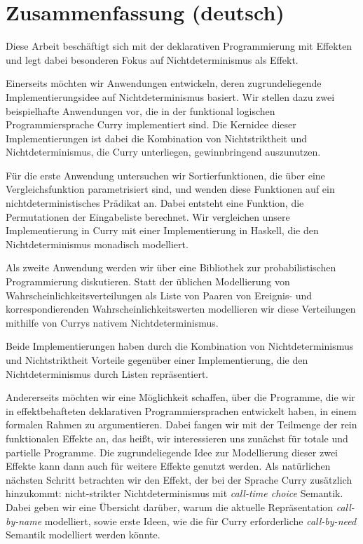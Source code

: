 \chapter*{Zusammenfassung (deutsch)}
\label{sec:abstract-diff}

Diese Arbeit besch\"aftigt sich mit der deklarativen Programmierung mit Effekten und legt dabei besonderen Fokus auf Nichtdeterminismus als Effekt.

Einerseits m\"ochten wir Anwendungen entwickeln, deren zugrundeliegende Implementierungsidee auf Nichtdeterminismus basiert.
Wir stellen dazu zwei beispielhafte Anwendungen vor, die in der funktional logischen Programmiersprache Curry implementiert sind.
Die Kernidee dieser Implementierungen ist dabei die Kombination von Nichtstriktheit und Nichtdeterminismus, die Curry unterliegen, gewinnbringend auszunutzen.

F\"ur die erste Anwendung untersuchen wir Sortierfunktionen, die \"uber eine Vergleichsfunktion parametrisiert sind, und wenden diese Funktionen auf ein nichtdeterministisches Pr\"adikat an.
Dabei entsteht eine Funktion, die Permutationen der Eingabeliste berechnet.
Wir vergleichen unsere Implementierung in Curry mit einer Implementierung in Haskell, die den Nichtdeterminismus monadisch modelliert.

Als zweite Anwendung werden wir \"uber eine Bibliothek zur probabilistischen Programmierung diskutieren.
Statt der \"ublichen Modellierung von Wahrscheinlichkeitsverteilungen als Liste von Paaren von Ereignis- und korrespondierenden Wahrscheinlichkeitswerten modellieren wir diese Verteilungen mithilfe von Currys nativem Nichtdeterminismus.

Beide Implementierungen haben durch die Kombination von Nichtdeterminismus und Nichtstriktheit Vorteile gegen\"uber einer Implementierung, die den Nichtdeterminismus durch Listen repr\"asentiert.

Andererseits m\"ochten wir eine M\"oglichkeit schaffen, \"uber die Programme, die wir in effektbehafteten deklarativen Programmiersprachen entwickelt haben, in einem formalen Rahmen zu argumentieren.
Dabei fangen wir mit der Teilmenge der rein funktionalen Effekte an, das hei\ss{}t, wir interessieren uns zun\"achst f\"ur totale und partielle Programme.
Die zugrundeliegende Idee zur Modellierung dieser zwei Effekte kann dann auch f\"ur weitere Effekte genutzt werden.
Als nat\"urlichen n\"achsten Schritt betrachten wir den Effekt, der bei der Sprache Curry zus\"atzlich hinzukommt: nicht\--strikter Nichtdeterminismus mit \emph{call\--time choice} Semantik.
Dabei geben wir eine \"Ubersicht dar\"uber, warum die aktuelle Repr\"asentation \emph{call\--by\--name} modelliert, sowie erste Ideen, wie die f\"ur Curry erforderliche \emph{call\--by\--need} Semantik modelliert werden k\"onnte.

\endgroup